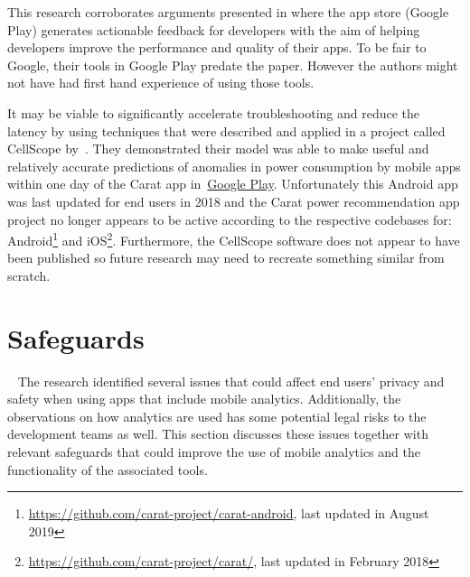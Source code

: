 This research corroborates arguments presented in  where the app store (Google Play) generates actionable feedback for developers with the aim of helping developers improve the performance and quality of their apps. To be fair to Google, their tools in Google Play predate the paper. However the authors might not have had first hand experience of using those tools. %

It may be viable to significantly accelerate troubleshooting and reduce the latency by using techniques that were described and applied in a project called CellScope by~. They demonstrated their model was able to make useful and relatively accurate predictions of anomalies in power consumption by mobile apps within one day of the Carat app in~\href{https://play.google.com/store/apps/details?id=edu.berkeley.cs.amplab.carat.android&hl=en_GB&gl=US}{Google Play}. Unfortunately this Android app was last updated for end users in 2018 and the Carat power recommendation app project no longer appears to be active according to the respective codebases for: Android\footnote{\url{https://github.com/carat-project/carat-android}, last updated in August 2019} and iOS\footnote{\url{https://github.com/carat-project/carat/}, last updated in February 2018}. Furthermore, the CellScope software does not appear to have been published so future research may need to recreate something similar from scratch.



\section{Safeguards}~\label{discussion-safeguards-section}
The research identified several issues that could affect end users' privacy and safety when using apps that include mobile analytics. Additionally, the observations on how analytics are used has some potential legal risks to the development teams as well. This section discusses these issues together with relevant safeguards that could improve the use of mobile analytics and the functionality of the associated tools. 

